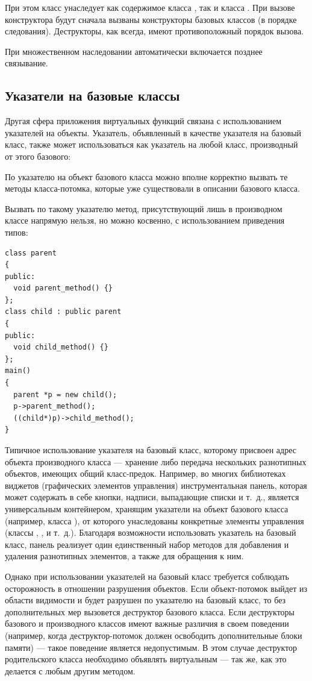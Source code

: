 При этом класс  унаследует как содержимое класса , так и класса
. При вызове конструктора будут сначала вызваны конструкторы базовых классов (в порядке
следования). Деструкторы, как всегда, имеют противоположный порядок вызова.

При множественном наследовании автоматически включается позднее связывание.

\subsection[Указатели на базовые классы]{Указатели на базовые классы}
Другая сфера приложения виртуальных функций связана с использованием указателей на объекты. Указатель, объявленный в
качестве указателя на базовый класс, также может использоваться как указатель на любой класс, производный от этого
базового:


По указателю на объект базового класса можно вполне корректно вызвать те методы класса-потомка, которые уже существовали
в описании базового класса. 

Вызвать по такому указателю метод, присутствующий лишь в производном классе напрямую нельзя, но можно косвенно, с
использованием приведения типов:
\begin{lstlisting}
class parent 
{
public:
  void parent_method() {}
};
class child : public parent 
{
public:
  void child_method() {}
};
main() 
{
  parent *p = new child();
  p->parent_method();
  ((child*)p)->child_method();
} 
\end{lstlisting}

Типичное использование указателя на базовый класс, которому присвоен адрес объекта производного класса --- хранение либо
передача нескольких разнотипных объектов, имеющих общий класс-предок. Например, во многих библиотеках виджетов
(графических элементов управления) инструментальная панель, которая  может содержать в себе кнопки, надписи, выпадающие
списки и т.~д., является универсальным контейнером, хранящим указатели на объект базового класса (например, класса
),  от которого унаследованы конкретные элементы управления (классы
, ,  и т.~д.). Благодаря возможности
использовать указатель на базовый класс, панель реализует один единственный набор методов для добавления и удаления
разнотипных элементов, а также для обращения к ним.

Однако при использовании указателей на базовый класс требуется соблюдать осторожность в отношении разрушения объектов.
Если объект-потомок выйдет из области видимости и будет разрушен по указателю на базовый класс, то без дополнительных
мер вызовется деструктор базового класса. Если деструкторы базового и производного классов имеют важные различия в
своем поведении (например, когда деструктор-потомок должен освободить дополнительные блоки памяти) --- такое поведение
является недопустимым. В этом случае деструктор родительского класса необходимо объявлять виртуальным --- так же, как это
делается с любым другим методом.

